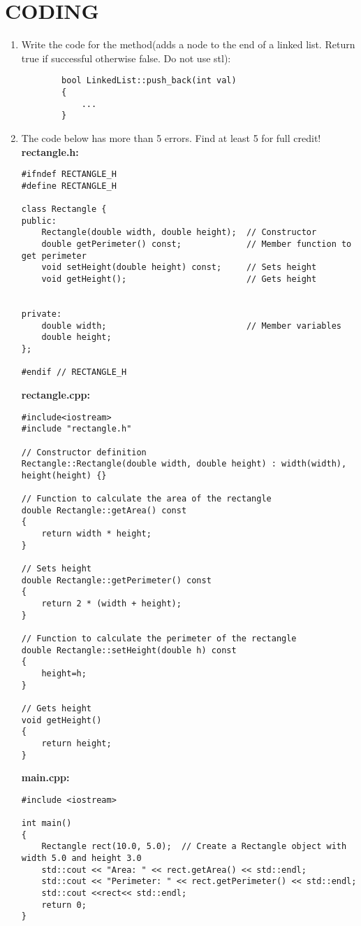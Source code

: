 \documentclass[a4paper]{article}
\begin{document}
\section{CODING}
\begin{enumerate}
    \item Write the code for the method(adds a node to the end of a linked list. Return true if successful otherwise false. Do not use stl): 
    \begin{verbatim}
        bool LinkedList::push_back(int val)
        {
            ...
        }
    \end{verbatim}\newpage
    \item The code below has more than 5 errors. Find at least 5 for full credit!\\
    \textbf{rectangle.h:}
    \begin{verbatim}
#ifndef RECTANGLE_H
#define RECTANGLE_H

class Rectangle {
public:
    Rectangle(double width, double height);  // Constructor                 
    double getPerimeter() const;             // Member function to get perimeter
    void setHeight(double height) const;     // Sets height
    void getHeight();                        // Gets height


private:
    double width;                            // Member variables
    double height;
};

#endif // RECTANGLE_H
    \end{verbatim}
    \textbf{rectangle.cpp:}
    \begin{verbatim}
#include<iostream>
#include "rectangle.h"

// Constructor definition
Rectangle::Rectangle(double width, double height) : width(width), height(height) {}

// Function to calculate the area of the rectangle
double Rectangle::getArea() const 
{
    return width * height;
}

// Sets height
double Rectangle::getPerimeter() const
{
    return 2 * (width + height);
}

// Function to calculate the perimeter of the rectangle
double Rectangle::setHeight(double h) const
{
    height=h;
}

// Gets height
void getHeight()
{
    return height;
}                      
\end{verbatim} 
\newpage
\textbf{main.cpp:}
\begin{verbatim}
#include <iostream>

int main() 
{
    Rectangle rect(10.0, 5.0);  // Create a Rectangle object with width 5.0 and height 3.0
    std::cout << "Area: " << rect.getArea() << std::endl;
    std::cout << "Perimeter: " << rect.getPerimeter() << std::endl;
    std::cout <<rect<< std::endl;
    return 0;
}
\end{verbatim}
\end{enumerate}
\newpage
\end{document}
